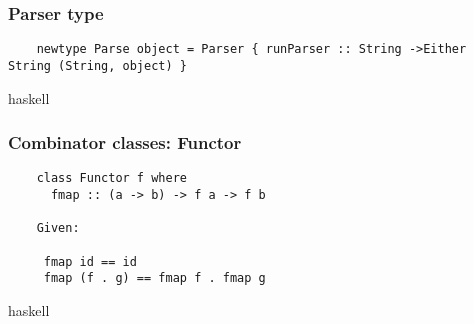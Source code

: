 \documentclass{beamer}
\begin{document}
\begin{frame}
  \frametitle{Parser type}

  \begin{verbatim}
    newtype Parse object = Parser { runParser :: String ->Either String (String, object) }
  \end{verbatim}{haskell}


\end{frame}


\begin{frame}
  \frametitle{Combinator classes: Functor}

  \begin{verbatim}
    class Functor f where
      fmap :: (a -> b) -> f a -> f b

    Given:

     fmap id == id
     fmap (f . g) == fmap f . fmap g
    \end{verbatim}{haskell}

\end{frame}


%
%
\end{document}
